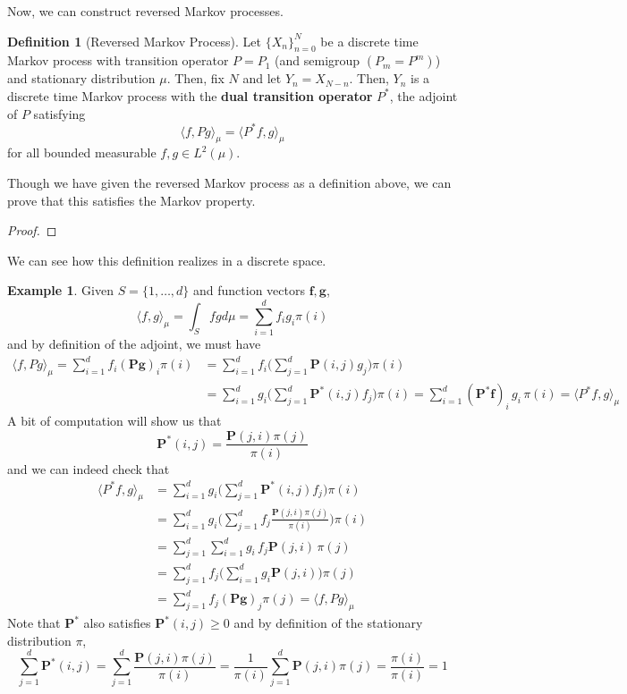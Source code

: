 \documentclass{article}
\theoremstyle{definition}
\newtheorem{example}{Example}[section]
\theoremstyle{remark}
\theoremstyle{definition}
\newtheorem{definition}{Definition}[section]
\begin{document}
Now, we can construct reversed Markov processes. 

\begin{definition}[Reversed Markov Process]
Let $\{X_n\}_{n=0}^N$ be a discrete time Markov process with transition operator $P = P_1$ (and semigroup $(P_m = P^m)$) and stationary distribution $\mu$. Then, fix $N$ and let $Y_n = X_{N - n}$. Then, $Y_n$ is a discrete time Markov process with the \textbf{dual transition operator} $P^*$, the adjoint of $P$ satisfying 
\[\langle f, P g \rangle_\mu = \langle P^* f, g \rangle_\mu\]
for all bounded measurable $f, g \in L^2 (\mu)$. 
\end{definition}

Though we have given the reversed Markov process as a definition above, we can prove that this satisfies the Markov property. 

\begin{proof}

\end{proof}

We can see how this definition realizes in a discrete space. 

\begin{example}
Given $S = \{1, \ldots, d\}$ and function vectors $\mathbf{f}, \mathbf{g}$, 
\[\langle f, g \rangle_\mu = \int_S f g d\mu = \sum_{i=1}^d f_i g_i \pi(i)\]
and by definition of the adjoint, we must have 
\begin{align*}
    \langle f, P g \rangle_\mu = \sum_{i=1}^d f_i (\mathbf{P} \mathbf{g})_i \pi(i) & = \sum_{i=1}^d f_i \bigg( \sum_{j=1}^d \mathbf{P}(i, j) g_j \bigg) \pi(i) \\
    & = \sum_{i=1}^d g_i \bigg( \sum_{j=1}^d \mathbf{P}^* (i, j) f_j \bigg) \pi(i) = \sum_{i=1}^d (\mathbf{P}^* \mathbf{f})_i \, g_i \, \pi(i) = \langle P^* f, g \rangle_\mu 
\end{align*}
A bit of computation will show us that 
\[\mathbf{P}^*(i, j) = \frac{\mathbf{P}(j, i) \pi(j)}{\pi(i)}\]
and we can indeed check that 
\begin{align*}
    \langle P^* f, g \rangle_\mu  & = \sum_{i=1}^d g_i \bigg( \sum_{j=1}^d \mathbf{P}^* (i, j) f_j \bigg) \pi(i) \\
    & = \sum_{i=1}^d g_i \bigg( \sum_{j=1}^d f_j \frac{\mathbf{P}(j, i) \pi(j)}{\pi(i)} \bigg) \pi(i) \\
    & = \sum_{j=1}^d \sum_{i=1}^d g_i \, f_j \mathbf{P}(j, i) \, \pi(j) \\
    & = \sum_{j=1}^d f_j \bigg( \sum_{i=1}^d g_i \mathbf{P}(j, i) \bigg) \pi(j) \\
    & = \sum_{j=1}^d f_j (\mathbf{P} \mathbf{g})_j \pi(j) = \langle f, P g \rangle_\mu
\end{align*}
Note that $\mathbf{P}^*$ also satisfies $\mathbf{P}^* (i, j) \geq 0$ and by definition of the stationary distribution $\pi$, 
\[\sum_{j=1}^d \mathbf{P}^* (i, j) = \sum_{j=1}^d \frac{\mathbf{P}(j, i) \pi(j)}{\pi(i)} = \frac{1}{\pi(i)} \sum_{j=1}^d \mathbf{P}(j, i) \pi(j) = \frac{\pi(i)}{\pi(i)} = 1 \]
\end{example}
\end{document}

